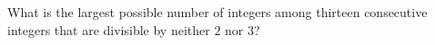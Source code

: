 What is the largest possible number of integers among thirteen consecutive integers that are divisible by neither $2$ nor $3$?
